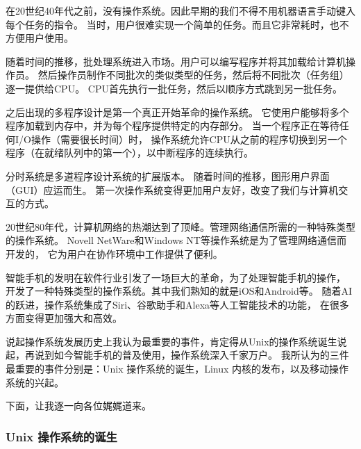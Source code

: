 \documentclass[UTF8]{homework.cls}
\begin{document}
\begin{homeworkProblem}
在20世纪40年代之前，没有操作系统。因此早期的我们不得不用机器语言手动键入每个任务的指令。
当时，用户很难实现一个简单的任务。而且它非常耗时，也不方便用户使用。

\vspace{\baselineskip}

随着时间的推移，批处理系统进入市场。用户可以编写程序并将其加载给计算机操作员。
然后操作员制作不同批次的类似类型的任务，然后将不同批次（任务组）逐一提供给CPU。
CPU首先执行一批任务，然后以顺序方式跳到另一批任务。

\vspace{\baselineskip}

之后出现的多程序设计是第一个真正开始革命的操作系统。
它使用户能够将多个程序加载到内存中，并为每个程序提供特定的内存部分。
当一个程序正在等待任何I/O操作（需要很长时间）时，
操作系统允许CPU从之前的程序切换到另一个程序（在就绪队列中的第一个），以中断程序的连续执行。

\vspace{\baselineskip}

分时系统是多道程序设计系统的扩展版本。
随着时间的推移，图形用户界面（GUI）应运而生。
第一次操作系统变得更加用户友好，改变了我们与计算机交互的方式。

\vspace{\baselineskip}

20世纪80年代，计算机网络的热潮达到了顶峰。管理网络通信所需的一种特殊类型的操作系统。
Novell NetWare和Windows NT等操作系统是为了管理网络通信而开发的，
它为用户在协作环境中工作提供了便利。

\vspace{\baselineskip}

智能手机的发明在软件行业引发了一场巨大的革命，为了处理智能手机的操作，
开发了一种特殊类型的操作系统。其中我们熟知的就是iOS和Android等。
随着AI的跃进，操作系统集成了Siri、谷歌助手和Alexa等人工智能技术的功能，
在很多方面变得更加强大和高效。

\vspace{\baselineskip}

说起操作系统发展历史上我认为最重要的事件，肯定得从Unix的操作系统诞生说起，再说到如今智能手机的普及使用，操作系统深入千家万户。
我所认为的三件最重要的事件分别是：Unix 操作系统的诞生，Linux 内核的发布，以及移动操作系统的兴起。

\vspace{\baselineskip}

下面，让我逐一向各位娓娓道来。

\subsubsection{Unix 操作系统的诞生}


\end{homeworkProblem}
\end{document}
